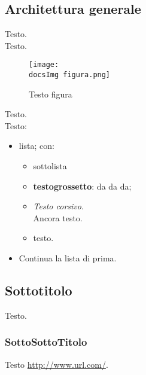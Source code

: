 {	\subsection{Architettura generale}{
		Testo.
	\\
		Testo.
		\begin{figure}[ht]
			\centering
			\texttt{[image: \\docsImg figura.png]}
			\caption{Testo figura}
			\label{Testo figura}
		\end{figure}
		
		Testo.
		\\
		Testo:
		\begin{itemize}\itemsep1pt
			\item lista; con:
			\begin{itemize}\itemsep1pt
				\item sottolista
				\item \textbf{testogrossetto}: da da da;
				\item \textit{Testo corsivo}.\\ 
				Ancora testo.
				\item testo.
			\end{itemize}
			\item Continua la lista di prima.
		\end{itemize}
		}
	\subsection{Sottotitolo}{
		Testo.
		\subsubsection{SottoSottoTitolo}{
			Testo \url{http://www.url.com/}.
		}
	}
}
